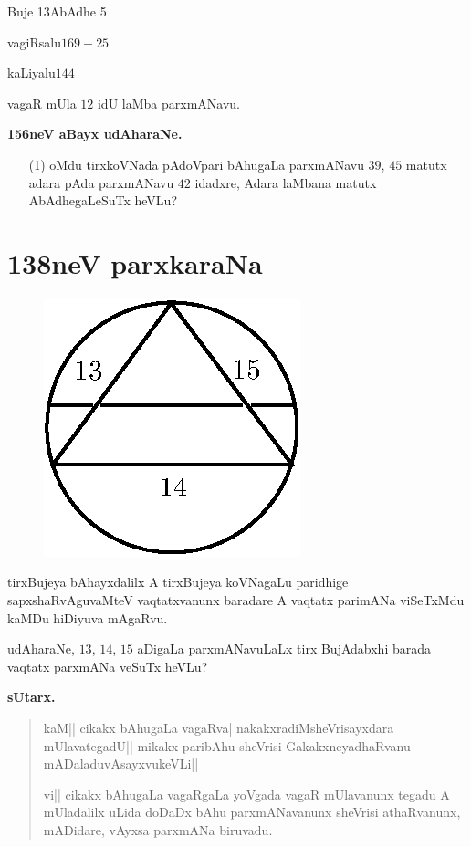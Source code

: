 Buje 13\qquad AbAdhe 5

vagiRsalu\quad $169-25$

kaLiyalu\quad $144$

vagaR mUla $12$ idU laMba parxmANavu.


\medskip

\begin{center}
{\large\bf 156neV aBayx udAharaNe.}
\end{center}

\begin{itemize}
\item[\rm(1)] oMdu tirxkoVNada pAdoVpari bAhugaLa parxmANavu $39$,
$45$ matutx adara pAda parxmANavu $42$ idadxre, Adara laMbana matutx
AbAdhegaLeSuTx heVLu?
\end{itemize}



\chapter{138neV parxkaraNa}


\begin{figure}[H]
\centering
\includegraphics{figure/fig32.eps}
\end{figure}

tirxBujeya bAhayxdalilx A tirxBujeya koVNagaLu paridhige
sapxshaRvAguvaMteV vaqtatxvanunx baradare A vaqtatx parimANa viSeTxMdu
kaMDu hiDiyuva mAgaRvu.

udAharaNe, $13$, $14$, $15$ aDigaLa parxmANavuLaLx tirx BujAdabxhi
barada vaqtatx parxmANa veSuTx heVLu?

\medskip
\begin{center}
{\large\bf sUtarx.}
\end{center}

\begin{verse}
kaM|| cikakx bAhugaLa vagaRva| nakakxradiMsheVrisayxdara
mUlavategadU|| mikakx paribAhu sheVrisi Gakakxneya\-dhaRvanu
mADaladuvAsayxvukeVLi||

vi|| cikakx bAhugaLa vagaRgaLa yoVgada vagaR mUlavanunx tegadu A
mUladalilx uLida doDaDx bAhu parxmANavanunx sheVrisi athaRvanunx,
mADidare, vAyxsa parxmANa biruvadu.
\end{verse}

